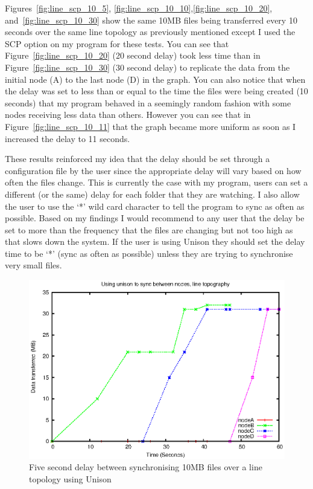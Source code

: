 \documentclass[12pt]{article}
\begin{document}
Figures~\ref{fig:line_scp_10_5},
\ref{fig:line_scp_10_10},\ref{fig:line_scp_10_20},
and~\ref{fig:line_scp_10_30} show the same 10MB files
being transferred every 10 seconds over the same line topology
as previously
mentioned except I used the SCP option on my program for
these tests. You can see that
Figure~\ref{fig:line_scp_10_20} (20 second delay) took less time than
in Figure~\ref{fig:line_scp_10_30} (30 second delay)
to replicate the
data from the initial node (A) to the last node (D) in
the graph. You can also notice that when the delay was
set to less than or equal to the time the files were
being created (10 seconds) that my program behaved 
in a seemingly random fashion with some nodes receiving less data
than others. However you can see that in Figure~\ref{fig:line_scp_10_11}
that the graph became more uniform as
soon as I increased the delay to 11 seconds.

These results reinforced my idea that the delay should
be set through a configuration file by the user since
the appropriate delay will vary based on how often
the files change. This is currently the case with my
program, users can set a different (or the same)
delay for each folder that they are watching. I
also allow the user to use the `*' wild card character
to tell the program to sync as often as possible. Based
on my findings I would recommend to any user that
the delay be set to more than the frequency that the files
are changing but not too high as that slows down
the system. If the user is using Unison they should
set the delay time to be `*' (sync as often as possible)
unless they are trying to synchronise very small files.

\newpage
\begin{figure}[ht!]
\centering
\includegraphics[height=0.4\textheight]{images/line-uni-10-5.eps}
\caption{Five second delay between synchronising 10MB files over a line topology
using Unison}
\label{fig:line_uni_10_5}
\end{figure}
\end{document}
